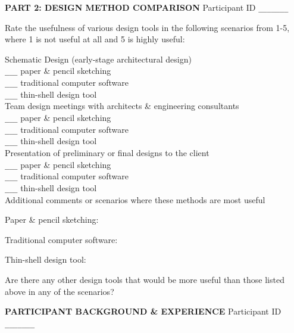 \documentclass{thesis}
\begin{document}
\newpage
{\bf PART 2: DESIGN METHOD COMPARISON} 
\hfill Participant ID \verb+_______+
\vspace{0.3in}

Rate the usefulness of various design tools in the following scenarios from 1-5,
where 1 is not useful at all and 5 is highly useful:


Schematic Design (early-stage architectural design)\\
\verb+___+ paper \& pencil sketching \\
\verb+___+ traditional computer software \\
\verb+___+ thin-shell design tool \\
Team design meetings with architects \& engineering consultants\\
\verb+___+ paper \& pencil sketching \\
\verb+___+ traditional computer software \\
\verb+___+ thin-shell design tool \\
Presentation of preliminary or final designs to the client\\
\verb+___+ paper \& pencil sketching \\
\verb+___+ traditional computer software \\
\verb+___+ thin-shell design tool \\


Additional comments or scenarios where these methods are most useful
\vspace{0.15in}

\hspace*{0.3in} 
Paper \& pencil sketching:
\vspace{0.7in}

\hspace*{0.3in} 
Traditional computer software:
\vspace{0.7in}

\hspace*{0.3in} 
Thin-shell design tool:
\vspace{0.7in}

Are there any other design tools that would be more useful than those listed above
in any of the scenarios?


\newpage
{\bf PARTICIPANT BACKGROUND \& EXPERIENCE}
\hfill Participant ID \verb+_______+
\vspace{0.3in}

\renewcommand\arraystretch{2}
\end{document}
